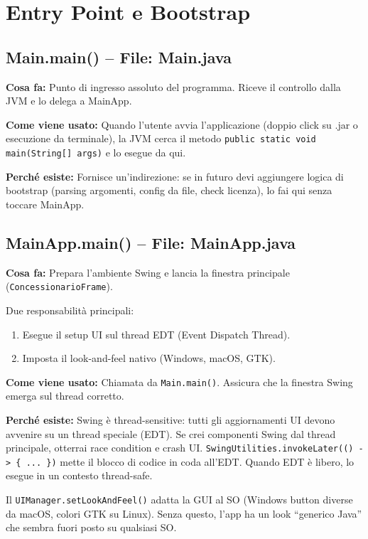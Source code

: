 \documentclass[12pt,a4paper]{article}
\begin{document}
\section{Entry Point e Bootstrap}

\subsection{Main.main() -- File: Main.java}

\textbf{Cosa fa:}
Punto di ingresso assoluto del programma. Riceve il controllo dalla JVM e lo delega a MainApp.

\textbf{Come viene usato:}
Quando l'utente avvia l'applicazione (doppio click su .jar o esecuzione da terminale), la JVM cerca il metodo \texttt{public static void main(String[] args)} e lo esegue da qui.

\textbf{Perché esiste:}
Fornisce un'indirezione: se in futuro devi aggiungere logica di bootstrap (parsing argomenti, config da file, check licenza), lo fai qui senza toccare MainApp.

\subsection{MainApp.main() -- File: MainApp.java}

\textbf{Cosa fa:}
Prepara l'ambiente Swing e lancia la finestra principale (\texttt{ConcessionarioFrame}).

Due responsabilità principali:
\begin{enumerate}
  \item Esegue il setup UI sul thread EDT (Event Dispatch Thread).
  \item Imposta il look-and-feel nativo (Windows, macOS, GTK).
\end{enumerate}

\textbf{Come viene usato:}
Chiamata da \texttt{Main.main()}. Assicura che la finestra Swing emerga sul thread corretto.

\textbf{Perché esiste:}
Swing è thread-sensitive: tutti gli aggiornamenti UI devono avvenire su un thread speciale (EDT).
Se crei componenti Swing dal thread principale, otterrai race condition e crash UI.
\texttt{SwingUtilities.invokeLater(() -> \{ ... \})} mette il blocco di codice in coda all'EDT.
Quando EDT è libero, lo esegue in un contesto thread-safe.

Il \texttt{UIManager.setLookAndFeel()} adatta la GUI al SO (Windows button diverse da macOS, colori GTK su Linux).
Senza questo, l'app ha un look ``generico Java'' che sembra fuori posto su qualsiasi SO.
\end{document}
